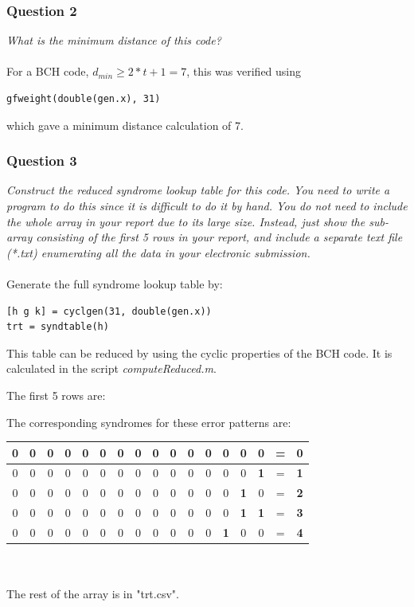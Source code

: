 \documentclass[a4paper]{article}
\begin{document}
\subsubsection{Question 2} \textit{What is the minimum distance of this code?} \\
\\
For a BCH code, $d_{min} \geq 2*t + 1 = 7$, this was verified using 
\begin{lstlisting}
gfweight(double(gen.x), 31)
\end{lstlisting}
which gave a minimum distance calculation of 7.

\subsubsection{Question 3} \textit{Construct the reduced syndrome lookup table for this code. You need to write a program to do this since it is difficult to do it by hand. You do not need to include the whole array in your report due to its large size. Instead, just show the sub-array consisting of the first 5 rows in your report, and include a separate text file (*.txt) enumerating all the data in your electronic submission.} \\
\\
Generate the full syndrome lookup table by:
\begin{lstlisting}
[h g k] = cyclgen(31, double(gen.x))
trt = syndtable(h)
\end{lstlisting}
This table can be reduced by using the cyclic properties of the BCH code. It is calculated in the script \textit{computeReduced.m}.

The first 5 rows are:\\

The corresponding syndromes for these error patterns are:\\
\begin{tabular}{| *{15}{c} | c c |}
\hline
0 & 0 & 0 & 0 & 0 & 0 & 0 & 0 & 0 & 0 & 0 & 0 & 0 & 0 & 0 & = & \textbf{0}  \\
\hline
0 & 0 & 0 & 0 & 0 & 0 & 0 & 0 & 0 & 0 & 0 & 0 & 0 & 0 & \textbf{1} & = & \textbf{1}  \\
\hline
0 & 0 & 0 & 0 & 0 & 0 & 0 & 0 & 0 & 0 & 0 & 0 & 0 & \textbf{1} & 0 & = & \textbf{2}  \\
\hline
0 & 0 & 0 & 0 & 0 & 0 & 0 & 0 & 0 & 0 & 0 & 0 & 0 & \textbf{1} & \textbf{1} & = & \textbf{3}  \\
\hline
0 & 0 & 0 & 0 & 0 & 0 & 0 & 0 & 0 & 0 & 0 & 0 & \textbf{1} & 0 & 0 & = & \textbf{4}  \\
\hline
\end{tabular}\\
\\
The rest of the array is in "trt.csv".
\end{document}

